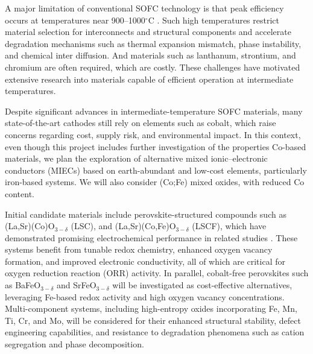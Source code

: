 A major limitation of conventional SOFC technology is that peak efficiency occurs at temperatures near 900–1000$^\circ$C \cite{Nigel2017,Gurbinder2016,skinnerd:2008}. Such high temperatures restrict material selection for interconnects and structural components and accelerate degradation mechanisms such as thermal expansion mismatch, phase instability, and chemical inter diffusion. And materials such as lanthanum, strontium, and chromium are often required, which are costly. These challenges have motivated extensive research into materials capable of efficient operation at intermediate temperatures.



Despite significant advances in intermediate-temperature SOFC materials, many state-of-the-art cathodes still rely on elements such as cobalt, which raise concerns regarding cost, supply risk, and environmental impact. In this context, even though this project includes further investigation of the properties Co-based materials, we plan the exploration of alternative mixed ionic–electronic conductors (MIECs) based on earth-abundant and low-cost elements, particularly iron-based systems. We will also consider (Co;Fe) mixed oxides, with reduced Co content.

Initial candidate materials include perovskite-structured compounds such as \linebreak (La,Sr)(Co)O$_{3-\delta}$ (LSC), and (La,Sr)(Co,Fe)O$_{3-\delta}$ (LSCF), which have demonstrated promising electrochemical performance in related studies \cite{GIL2024,MEJIAGOMEZ2020}. These systems benefit from tunable redox chemistry, enhanced oxygen vacancy formation, and improved electronic conductivity, all of which are critical for oxygen reduction reaction (ORR) activity. In parallel, cobalt-free perovskites such as BaFeO$_{3-\delta}$ and SrFeO$_{3-\delta}$ will be investigated as cost-effective alternatives, leveraging Fe-based redox activity and high oxygen vacancy concentrations. Multi-component systems, including high-entropy oxides incorporating Fe, Mn, Ti, Cr, and Mo, will be considered for their enhanced structural stability, defect engineering capabilities, and resistance to degradation phenomena such as cation segregation and phase decomposition.


